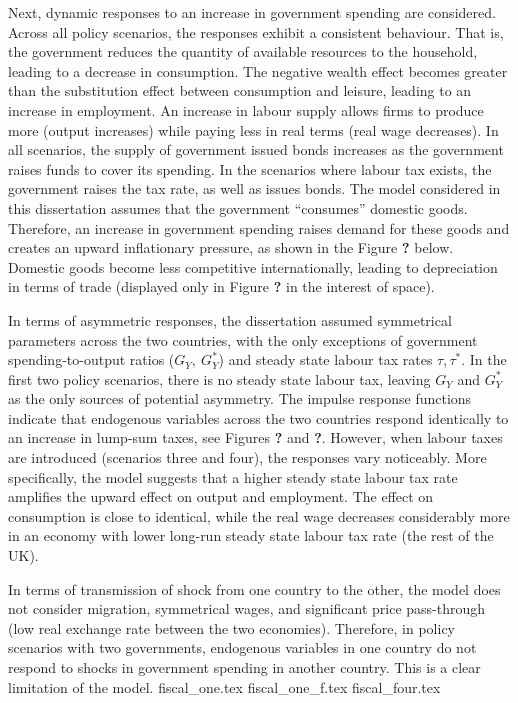Next, dynamic responses to an increase in government spending are considered. Across all policy scenarios, the responses exhibit a consistent behaviour. That is, the government reduces the quantity of available resources to the household, leading to a decrease in consumption. The negative wealth effect becomes greater than the substitution effect between consumption and leisure, leading to an increase in employment. An increase in labour supply allows firms to produce more (output increases) while paying less in real terms (real wage decreases). In all scenarios, the supply of government issued bonds increases as the government raises funds to cover its spending. In the scenarios where labour tax exists, the government raises the tax rate, as well as issues bonds. The model considered in this dissertation assumes that the government ``consumes'' domestic goods. Therefore, an increase in government spending raises demand for these goods and creates an upward inflationary pressure, as shown in the Figure \textbf{?} below. Domestic goods become less competitive internationally, leading to depreciation in terms of trade (displayed only in Figure \textbf{?} in the interest of space). 

In terms of asymmetric responses, the dissertation assumed symmetrical parameters across the two countries, with the only exceptions of government spending-to-output ratios ($G_Y, \ G_Y^*$) and steady state labour tax rates $\tau, \tau^*$. In the first two policy scenarios, there is no steady state labour tax, leaving $G_Y$ and $G_Y^*$ as the only sources of potential asymmetry. The impulse response functions indicate that endogenous variables across the two countries respond identically to an increase in lump-sum taxes, see Figures \textbf{?} and \textbf{?}. However, when labour taxes are introduced (scenarios three and four), the responses vary noticeably. More specifically, the model suggests that a higher steady state labour tax rate amplifies the upward effect on output and employment. The effect on consumption is close to identical, while the real wage decreases considerably more in an economy with lower long-run steady state labour tax rate (the rest of the UK). 

In terms of transmission of shock from one country to the other, the model does not consider migration, symmetrical wages, and significant price pass-through (low real exchange rate between the two economies). Therefore, in policy scenarios with two governments, endogenous variables in one country do not respond to shocks in government spending in another country. This is a clear limitation of the model. 
{fiscal_one.tex}
\newpage
{fiscal_one_f.tex}
\newpage
{fiscal_four.tex}